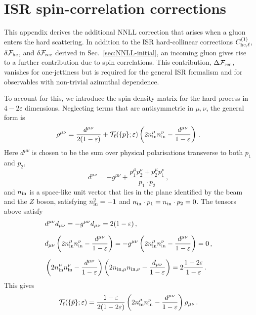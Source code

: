 \chapter{ISR spin-correlation corrections}
\label{app:spin-correl}

This appendix derives the additional NNLL correction that arises when
a gluon enters the hard scattering. In addition to the ISR
hard-collinear corrections
$C_{{\rm hc},\ell}^{(1)}$, $\delta\mathcal{F}_{\rm hc}$, and
$\delta\mathcal{F}_{\rm rec}$ derived in
Sec.~\ref{sec:NNLL-initial}, an incoming gluon gives rise to a further
contribution due to spin correlations. This contribution,
$\Delta\mathcal{F}_{\rm rec}$, vanishes for one-jettiness but is
required for the general ISR formalism and for observables with
non-trivial azimuthal dependence.

To account for this, we introduce the spin-density matrix for the hard process
in $4-2\varepsilon$ dimensions. Neglecting terms that are antisymmetric in $\mu,\nu$, the general form is 
\begin{equation}
\rho^{\mu\nu} = \frac{d^{\mu\nu} }{2(1-\varepsilon)}
+ \mathcal{T}_\ell(\{p\};\varepsilon)\left(2n_{\rm in}^\mu n_{\rm in }^\nu - \frac{d^{\mu\nu} }{1-\varepsilon}\right) \,.
\end{equation}
Here $d^{\mu\nu}$ is chosen to be the sum over physical polarisations transverse to both $p_1$ and $p_2$,
\begin{equation}
d^{\mu\nu} = -g^{\mu\nu} + \frac{p_1^\mu p_2^\nu + p_2^\mu p_1^\nu}{p_1 \cdot p_2}\,,
\end{equation}
and $n_{\rm in}$ is a space-like unit vector that lies in the plane identified
by the beam and the $Z$ boson, satisfying $n_{\rm in}^2=-1$ and $n_{\rm in}\cdot p_1=n_{\rm in}\cdot p_2=0$. 
The tensors above satisfy
\begin{subequations}
  \begin{align}
  &d^{\mu\nu}d_{\mu\nu}=-g^{\mu\nu}d_{\mu\nu}=2(1-\varepsilon)\,,\\[1.5ex]
  &d_{\mu\nu} \left(2n_{\rm in}^\mu n_{\rm in }^\nu - \frac{d^{\mu\nu}}{1-\varepsilon}\right)=-g^{\mu\nu}\left(2 n_{\rm in}^\mu n_{\rm in }^\nu - \frac{d^{\mu\nu}}{1-\varepsilon}\right)=0\,,\\[1.5ex] 
  &\left(2 n_{\rm in}^\mu n_{\rm in }^\nu - \frac{d^{\mu\nu}}{1-\varepsilon}\right)\left(2 n_{{\rm in},\mu} n_{{\rm in },\nu} - \frac{d_{\mu\nu}}{1-\varepsilon}\right) = 2 \frac{1-2\varepsilon}{1-\varepsilon}\,.
  \end{align}
\end{subequations}
This gives
\begin{equation}
  \label{eq:PL}
  \mathcal{T}_\ell(\{\tilde p\};\varepsilon) = \frac{1-\varepsilon}{2(1-2\varepsilon)} \left(2 n_{\rm in}^\mu n_{\rm in }^\nu - \frac{d^{\mu\nu}}{1-\varepsilon}\right) \rho_{\mu\nu}\,.
\end{equation}

